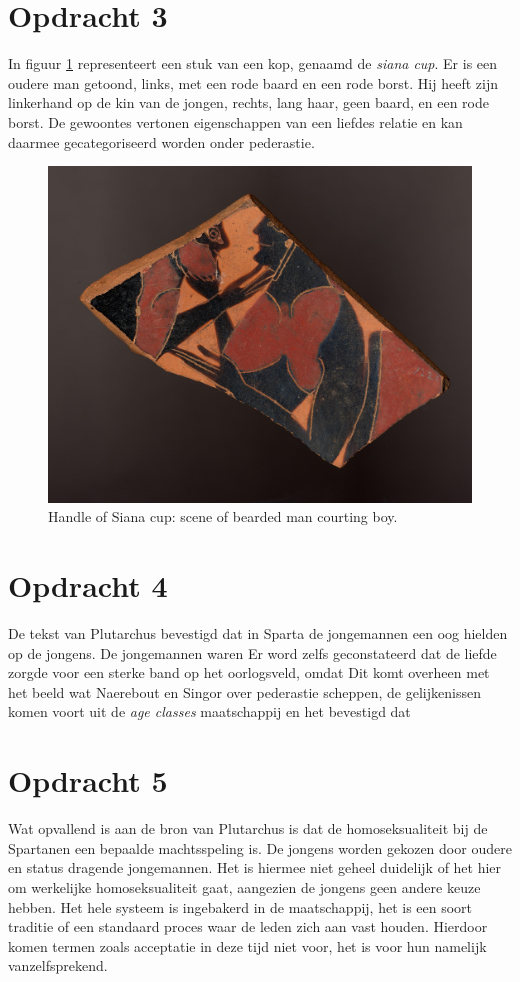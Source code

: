 \documentclass[10pt]{amsart}
\begin{document}
\section*{Opdracht 3}
\noindent In figuur \ref{fig:siana-cup} \autocite{SianaCup575BC} representeert een stuk van een kop, genaamd de \textit{siana
     cup}. Er is een oudere man getoond, links, met een rode baard en een rode borst. Hij heeft zijn linkerhand op de kin
van de jongen, rechts, lang haar, geen baard, en een rode borst. De gewoontes vertonen eigenschappen van een liefdes
relatie en kan daarmee gecategoriseerd worden onder pederastie.
\begin{figure}[H]
     \includegraphics[width=0.5\linewidth]{images/452769001.jpg}
     \caption{Handle of Siana cup: scene of bearded man courting boy.}
     \label{fig:siana-cup}
\end{figure}

\section*{Opdracht 4}
\noindent De tekst van Plutarchus bevestigd dat in Sparta de jongemannen een oog hielden op de jongens. De jongemannen waren
\autocite{plutarchusLevenVanPelopidas120} Er word zelfs geconstateerd dat de liefde zorgde voor een sterke
band op het oorlogsveld, omdat \autocite{plutarchusLevenVanPelopidas120} Dit komt overheen met het beeld wat Naerebout en Singor over
pederastie scheppen, de gelijkenissen komen voort uit de \textit{age classes} maatschappij en het bevestigd dat \autocite{naereboutOudheidGriekenRomeinen2022}

\section*{Opdracht 5}\label{opdracht5}
\noindent Wat opvallend is aan de bron van Plutarchus \autocite{plutarchusLevenVanPelopidas120} is dat de homoseksualiteit bij de
Spartanen een bepaalde machtsspeling is. De jongens worden gekozen door oudere en status dragende jongemannen. Het is
hiermee niet geheel duidelijk of het hier om werkelijke homoseksualiteit gaat, aangezien de jongens geen andere keuze
hebben. Het hele systeem is ingebakerd in de maatschappij, het is een soort traditie of een standaard proces waar de
leden zich aan vast houden. Hierdoor komen termen zoals acceptatie in deze tijd niet voor, het is voor hun namelijk
vanzelfsprekend.
\end{document}

